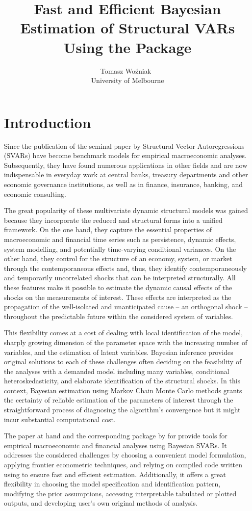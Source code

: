 \documentclass[
  nojss]{jss}
\author{
Tomasz Woźniak~\orcidlink{0000-0003-2212-2378}\\University of Melbourne
}
\title{Fast and Efficient Bayesian Estimation of Structural VARs Using
the \proglang{R} Package \pkg{bsvars}}
\begin{document}
\section{Introduction}

Since the publication of the seminal paper by
\cite{sims1980macroeconomics} Structural Vector Autoregressions (SVARs)
have become benchmark models for empirical macroeconomic analyses.
Subsequently, they have found numerous applications in other fields and
are now indispensable in everyday work at central banks, treasury
departments and other economic governance institutions, as well as in
finance, insurance, banking, and economic consulting.

The great popularity of these multivariate dynamic structural models was
gained because they incorporate the reduced and structural forms into a
unified framework. On the one hand, they capture the essential
properties of macroeconomic and financial time series such as
persistence, dynamic effects, system modelling, and potentially
time-varying conditional variances. On the other hand, they control for
the structure of an economy, system, or market through the
contemporaneous effects and, thus, they identify contemporaneously and
temporarily uncorrelated shocks that can be interpreted structurally.
All these features make it possible to estimate the dynamic causal
effects of the shocks on the measurements of interest. These effects are
interpreted as the propagation of the well-isolated and unanticipated
cause -- an orthogonal shock -- throughout the predictable future within
the considered system of variables.

This flexibility comes at a cost of dealing with local identification of
the model, sharply growing dimension of the parameter space with the
increasing number of variables, and the estimation of latent variables.
Bayesian inference provides original solutions to each of these
challenges often deciding on the feasibility of the analyses with a
demanded model including many variables, conditional heteroskedasticity,
and elaborate identification of the structural shocks. In this context,
Bayesian estimation using Markov Chain Monte Carlo methods grants the
certainty of reliable estimation of the parameters of interest through
the straightforward process of diagnosing the algorithm's convergence
but it might incur substantial computational cost.

The paper at hand and the corresponding package  by
\cite{bsvars} for  \citep{Rcore} provide tools for empirical
macroeconomic and financial analyses using Bayesian SVARs. It addresses
the considered challenges by choosing a convenient model formulation,
applying frontier econometric techniques, and relying on compiled code
written using  to ensure fast and efficient estimation.
Additionally, it offers a great flexibility in choosing the model
specification and identification pattern, modifying the prior
assumptions, accessing interpretable tabulated or plotted outputs, and
developing user's own original methods of analysis.
\end{document}
